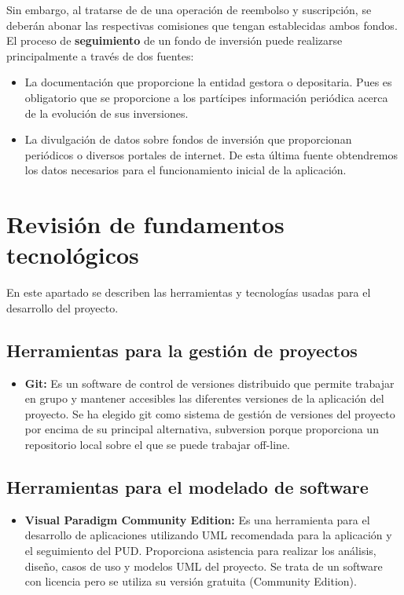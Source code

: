 \documentclass[12pt, a4paper]{article}
\begin{document}
Sin embargo, al tratarse de de una operación de reembolso y suscripción, se deberán abonar las respectivas comisiones que tengan establecidas ambos fondos.\\ 

El proceso de \textbf{seguimiento} de un fondo de inversión puede realizarse principalmente a través de dos fuentes:
\begin{itemize}
	\item La documentación que proporcione la entidad gestora o depositaria. Pues es obligatorio que se proporcione a los partícipes información periódica acerca de la evolución de sus inversiones.
	\item La divulgación de datos sobre fondos de inversión que proporcionan periódicos o diversos portales de internet. De esta última fuente obtendremos los datos necesarios para el funcionamiento inicial de la aplicación.
\end{itemize}
\newpage

\section{Revisión de fundamentos tecnológicos}

En este apartado se describen las herramientas y tecnologías usadas para el desarrollo del proyecto.

\subsection{Herramientas para la gestión de proyectos}
\begin{itemize}
	\item \textbf{Git: } Es un software de control de versiones distribuido que permite trabajar en grupo y mantener accesibles las diferentes versiones de la aplicación del proyecto. Se ha elegido git como sistema de gestión de versiones del proyecto por encima de su principal alternativa, subversion porque proporciona un repositorio local sobre el que se puede trabajar off-line.
\end{itemize}





\subsection{Herramientas para el modelado de software}

\begin{itemize}
	\item \textbf{Visual Paradigm Community Edition: }
	Es una herramienta para el desarrollo de aplicaciones utilizando \gls{UML} recomendada para la aplicación y el seguimiento del \gls{PUD}. Proporciona asistencia para realizar los análisis, diseño, casos de uso y modelos \gls{UML} del proyecto. Se trata de un software con licencia pero se utiliza su versión gratuita (Community Edition).
\end{itemize}
\end{document}
